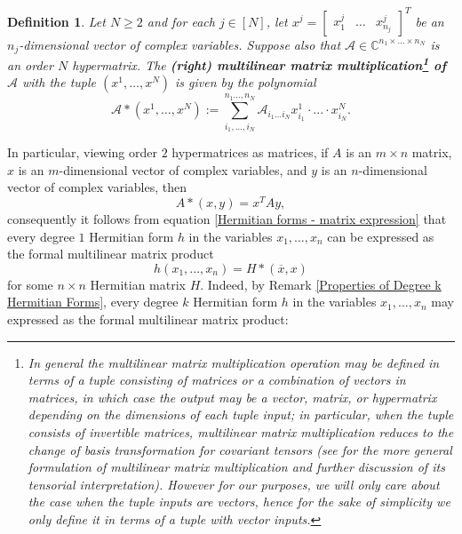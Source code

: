 \documentclass[11pt]{article}
\newtheorem{defn}[theorem]{Definition}
\begin{document}
\begin{defn}\label{multilinear-matrix-multiplication}
    Let $N\geq 2$ and for each $j\in [N]$, let $x^j = \left[\begin{array}{ccc}
        x^j_1 & \dots & x^j_{n_j}
    \end{array}\right]^T$ be an $n_j$-dimensional vector of complex variables. Suppose also that $\mathcal{A}\in \mathbb{C}^{n_1\times\dots\times n_N}$ is an order $N$ hypermatrix. The \textbf{(right) multilinear matrix multiplication\footnote{In general the multilinear matrix multiplication operation may be defined in terms of a tuple consisting of matrices or a combination of vectors in matrices, in which case the output may be a vector, matrix, or hypermatrix depending on the dimensions of each tuple input; in particular, when the tuple consists of invertible matrices, multilinear matrix multiplication reduces to the change of basis transformation for covariant tensors (see \cite{lim2013tensors} for the more general formulation of multilinear matrix multiplication and further discussion of its tensorial interpretation). However for our purposes, we will only care about the case when the tuple inputs are vectors, hence for the sake of simplicity we only define it in terms of a tuple with vector inputs.} of $\mathcal{A}$} with the tuple $(x^1,\dots,x^N)$ is given by the polynomial 
    \[\mathcal{A}*(x^1,\dots,x^N) := \sum\limits_{i_1,...,i_N}^{n_1\dots,n_N}\mathcal{A}_{i_1\dots i_N}x^1_{i_1}\cdot...\cdot x^N_{i_N}.\] 
\end{defn}
In particular, viewing order $2$ hypermatrices as matrices, if $A$ is an $m\times n$ matrix, $x$ is an $m$-dimensional vector of complex variables, and $y$ is an $n$-dimensional vector of complex variables, then  
\begin{equation}\label{Relationship between MM and MMM}
    A*(x,y) = x^TAy,
\end{equation} 
consequently it follows from equation \eqref{Hermitian forms - matrix expression} that every degree $1$ Hermitian form $h$ in the variables $x_1,\dots,x_n$ can be expressed as the formal multilinear matrix product
\begin{equation}\label{Hermitian quadratic form as MMM product}
    h(x_1,...,x_n) = H*(\overline{x},x)
\end{equation}
for some $n\times n$ Hermitian matrix $H$. Indeed, by Remark \ref{Properties of Degree k Hermitian Forms}, every degree $k$ Hermitian form $h$ in the variables $x_1,...,x_n$ may expressed as the formal multilinear matrix product:
\end{document}
